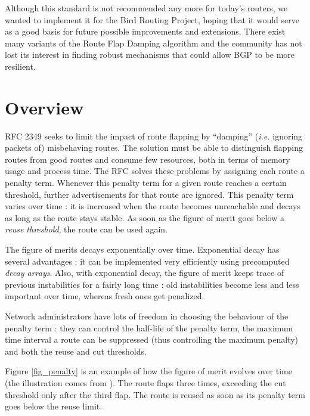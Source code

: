 \documentclass[a4paper,english]{IEEEtran}
\begin{document}
Although this standard is not recommended any more\cite{ripe recommendations}
for today's routers, we wanted to implement it for the Bird Routing
Project\cite{bird}, hoping that it would serve as a good basis for
future possible improvements and extensions. There exist
many variants of the Route Flap Damping algorithm and the community
has not lost its interest in finding robust mechanisms that could
allow BGP to be more resilient.


\section{Overview}

RFC 2349 seeks to limit the impact of route flapping by ``damping''
(\textit{i.e.} ignoring packets of) misbehaving routes. The solution
must be able to distinguish flapping routes from good routes and consume
few resources, both in terms of memory usage and process time. The
RFC solves these problems by assigning each route a penalty term.
Whenever this penalty term for a given route reaches a certain threshold,
further advertisements for that route are ignored. This penalty term
varies over time : it is increased when the route becomes unreachable
and decays as long as the route stays stable. As soon as the figure
of merit goes below a \textit{reuse threshold}, the route can be used
again.

The figure of merits decays exponentially over time. Exponential decay
has several advantages : it can be implemented very efficiently using
precomputed \textit{decay arrays}. Also, with exponential decay, the
figure of merit keeps trace of previous instabilities for a fairly
long time : old instabilities become less and less important over
time, whereas fresh ones get penalized.

Network administrators have lots of freedom in choosing the behaviour
of the penalty term : they can control the half-life of the penalty
term, the maximum time interval a route can be suppressed (thus 
controlling the maximum penalty) and both the reuse and cut thresholds.

Figure \ref{fig_penalty} is an example of how the figure of merit 
evolves over time (the illustration comes from \cite{damping-pic}).
The route flaps three times, exceeding the cut threshold only after 
the third flap. The route is reused as soon as its penalty term goes 
below the reuse limit.
\end{document}
